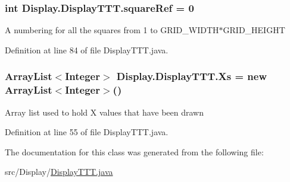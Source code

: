 \subsubsection[{square\+Ref}]{\setlength{\rightskip}{0pt plus 5cm}int Display.\+Display\+T\+T\+T.\+square\+Ref = 0\hspace{0.3cm}{\ttfamily [private]}}\label{class_display_1_1_display_t_t_t_a72b67bc50aa6ba47ae9d398e597c49bb}
A numbering for all the squares from 1 to G\+R\+I\+D\+\_\+\+W\+I\+D\+T\+H$\ast$\+G\+R\+I\+D\+\_\+\+H\+E\+I\+G\+H\+T 

Definition at line 84 of file Display\+T\+T\+T.\+java.

\hypertarget{class_display_1_1_display_t_t_t_a7dc4fccda99b958bd1dead1dc6543442}{}
\subsubsection[{Xs}]{\setlength{\rightskip}{0pt plus 5cm}Array\+List$<$Integer$>$ Display.\+Display\+T\+T\+T.\+Xs = new Array\+List$<$Integer$>$()\hspace{0.3cm}{\ttfamily [private]}}\label{class_display_1_1_display_t_t_t_a7dc4fccda99b958bd1dead1dc6543442}
Array list used to hold X values that have been drawn 

Definition at line 55 of file Display\+T\+T\+T.\+java.



The documentation for this class was generated from the following file\+:\begin{DoxyCompactItemize}
\item 
src/\+Display/\hyperlink{_display_t_t_t_8java}{Display\+T\+T\+T.\+java}\end{DoxyCompactItemize}
